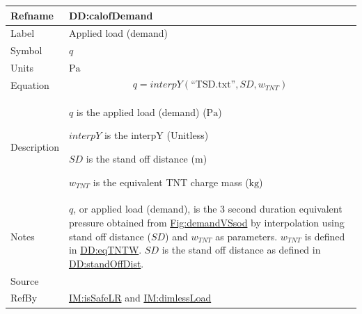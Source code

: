\documentclass[12pt]{article}
\begin{document}
\medskip
\noindent
\begin{minipage}{\textwidth}
\begin{tabular}{>{\raggedright}p{}>{\raggedright\arraybackslash}p{}}
\toprule \textbf{Refname} & \textbf{DD:calofDemand}
\label{DD:calofDemand}
\\ \midrule
Label & Applied load (demand)
        
\\ \midrule
Symbol & $q$
         
\\ \midrule
Units & ${\text{Pa}}$
        
\\ \midrule
Equation & \begin{displaymath}
           q=\mathit{interpY}\left(\text{``TSD.txt''},\mathit{SD},{w_{\mathit{TNT}}}\right)
           \end{displaymath}
\\ \midrule
Description & \begin{symbDescription}
              \item{$q$ is the applied load (demand) (${\text{Pa}}$)}
              \item{$\mathit{interpY}$ is the interpY (Unitless)}
              \item{$\mathit{SD}$ is the stand off distance (${\text{m}}$)}
              \item{${w_{\mathit{TNT}}}$ is the equivalent TNT charge mass (${\text{kg}}$)}
              \end{symbDescription}
\\ \midrule
Notes & $q$, or applied load (demand), is the 3 second duration equivalent pressure obtained from \hyperref[Figure:demandVSsod]{Fig:demandVSsod} by interpolation using stand off distance ($\mathit{SD}$) and ${w_{\mathit{TNT}}}$ as parameters. ${w_{\mathit{TNT}}}$ is defined in \hyperref[DD:eqTNTW]{DD:eqTNTW}. $\mathit{SD}$ is the stand off distance as defined in \hyperref[DD:standOffDist]{DD:standOffDist}.
        
\\ \midrule
Source & \cite{astm2009}
         
\\ \midrule
RefBy & \hyperref[IM:isSafeLR]{IM:isSafeLR} and \hyperref[IM:dimlessLoad]{IM:dimlessLoad}
        
\\ \bottomrule
\end{tabular}
\end{minipage}
\end{document}
